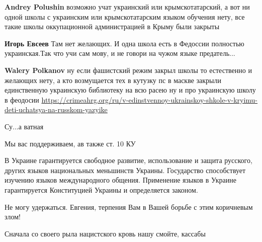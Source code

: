 \begin{itemize}
\begin{itemize}
\textbf{Andrey Polushin} возможно учат украинский или крымскотатарский, а вот ни одной школы с украинским или крымскотатарским языком обучения нету, все такие школы оккупационной администрацией в Крыму были закрыты


\textbf{Игорь Евсеев} Там нет желающих. И одна школа есть в Федоссии полностью украинская.Так что учи сам мову, и не говори на чужом языке предатель...\Laughey[1.0][white]


\textbf{Walery Polkanov} ну если фашистский режим закрыл школы то естественно и желающих нету, а кто возмущается тех в кутузку
пс в маскве закрыли единственную украинскую библиотеку на всю расею
ну и про украинскую школу в феодосии
\url{https://crimeahrg.org/ru/v-edinstvennoy-ukrainskoy-shkole-v-kryimu-deti-uchatsya-na-russkom-yazyike}
\end{itemize}


Су...а ватная


Мы вас поддерживаем, ав также ст. 10 КУ

В Украине гарантируется свободное развитие, использование и защита русского,
других языков национальных меньшинств Украины. Государство способствует
изучению языков международного общения. Применение языков в Украине
гарантируется Конституцией Украины и определяется законом.


Не могу удержаться. Евгения, терпения Вам в Вашей борьбе с этим коричневым
злом!

\begin{itemize}

Сначала со своего рыла нацистского кровь нашу смойте, кассабы



\end{itemize}
\end{itemize}
